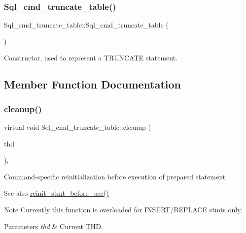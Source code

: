 \subsubsection{\texorpdfstring{Sql\+\_\+cmd\+\_\+truncate\+\_\+table()}{Sql\_cmd\_truncate\_table()}}
{\footnotesize\ttfamily Sql\+\_\+cmd\+\_\+truncate\+\_\+table\+::\+Sql\+\_\+cmd\+\_\+truncate\+\_\+table (\begin{DoxyParamCaption}{ }\end{DoxyParamCaption})\hspace{0.3cm}{\ttfamily [inline]}}

Constructor, used to represent a T\+R\+U\+N\+C\+A\+TE statement. 

\subsection{Member Function Documentation}
\mbox{\label{classSql__cmd__truncate__table_aef61dc712f14dc3f3c0a343806f5de54}} 
\subsubsection{\texorpdfstring{cleanup()}{cleanup()}}
{\footnotesize\ttfamily virtual void Sql\+\_\+cmd\+\_\+truncate\+\_\+table\+::cleanup (\begin{DoxyParamCaption}\item[{T\+HD $\ast$}]{thd }\end{DoxyParamCaption})\hspace{0.3cm}{\ttfamily [inline]}, {\ttfamily [virtual]}}

Command-\/specific reinitialization before execution of prepared statement

\begin{DoxySeeAlso}{See also}
\mbox{\hyperlink{sql__prepare_8cc_a230ccb139578f6e2099fcd40a6ca57ad}{reinit\+\_\+stmt\+\_\+before\+\_\+use()}}
\end{DoxySeeAlso}
\begin{DoxyNote}{Note}
Currently this function is overloaded for I\+N\+S\+E\+R\+T/\+R\+E\+P\+L\+A\+CE stmts only.
\end{DoxyNote}

\begin{DoxyParams}{Parameters}
{\em thd} & Current T\+HD. \\
\hline
\end{DoxyParams}


